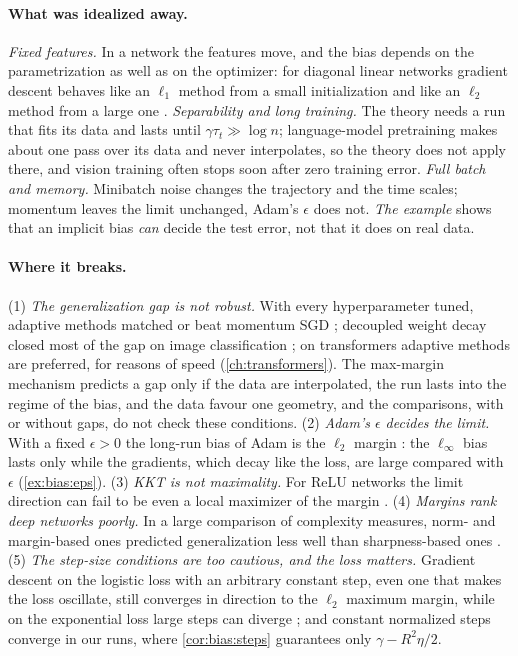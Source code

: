 \begin{refsection}
\paragraph{What was idealized away.} \emph{Fixed features.} In a network the features move, and the bias depends on the parametrization as well as on the optimizer: for diagonal linear networks gradient descent behaves like an $\ell_1$ method from a small initialization and like an $\ell_2$ method from a large one \parencite{WoodworthEtAl2020}. \emph{Separability and long training.} The theory needs a run that fits its data and lasts until $\gamma\tau_t\gg\log n$; language-model pretraining makes about one pass over its data and never interpolates, so the theory does not apply there, and vision training often stops soon after zero training error. \emph{Full batch and memory.} Minibatch noise changes the trajectory and the time scales; momentum leaves the limit unchanged, Adam's $\epsilon$ does not. \emph{The example} shows that an implicit bias \emph{can} decide the test error, not that it does on real data.

\paragraph{Where it breaks.} (1) \emph{The generalization gap is not robust.} With every hyperparameter tuned, adaptive methods matched or beat momentum SGD \parencite{ChoiEtAl2019}; decoupled weight decay closed most of the gap on image classification \parencite{LoshchilovHutter2019}; on transformers adaptive methods are preferred, for reasons of speed (\cref{ch:transformers}). The max-margin mechanism predicts a gap only if the data are interpolated, the run lasts into the regime of the bias, and the data favour one geometry, and the comparisons, with or without gaps, do not check these conditions. (2) \emph{Adam's $\epsilon$ decides the limit.} With a fixed $\epsilon>0$ the long-run bias of Adam is the $\ell_2$ margin \parencite{WangEtAl2021}: the $\ell_\infty$ bias lasts only while the gradients, which decay like the loss, are large compared with $\epsilon$ (\cref{ex:bias:eps}). (3) \emph{KKT is not maximality.} For ReLU networks the limit direction can fail to be even a local maximizer of the margin \parencite{VardiShamirSrebro2022}. (4) \emph{Margins rank deep networks poorly.} In a large comparison of complexity measures, norm- and margin-based ones predicted generalization less well than sharpness-based ones \parencite{JiangEtAl2020}. (5) \emph{The step-size conditions are too cautious, and the loss matters.} Gradient descent on the logistic loss with an arbitrary constant step, even one that makes the loss oscillate, still converges in direction to the $\ell_2$ maximum margin, while on the exponential loss large steps can diverge \parencite{WuBravermanLee2023}; and constant normalized steps converge in our runs, where \cref{cor:bias:steps} guarantees only $\gamma-R^2\eta/2$.


\end{refsection}
